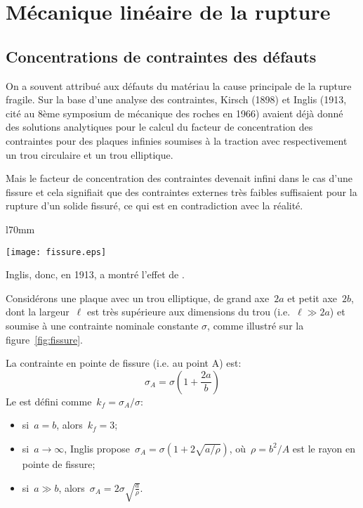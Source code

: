 \newpage
\section{Mécanique linéaire de la rupture}

\medskip
\subsection{Concentrations de contraintes des défauts}

\begin{histoire}%
\ifVersionDuDocEstVincent{}\selectfont\fi
On a souvent attribué aux défauts du matériau la cause principale de la rupture fragile. Sur la base d'une analyse des contraintes, Kirsch (1898) et Inglis (1913, cité au 8ème symposium de mécanique des roches en 1966) avaient déjà donné des solutions analytiques pour le calcul du facteur de concentration des contraintes pour des plaques infinies soumises à la traction avec respectivement un trou circulaire et un trou elliptique.

\medskip
Mais le facteur de concentration des contraintes devenait infini dans le cas d'une fissure et cela signifiait que des contraintes externes très faibles suffisaient pour la rupture d'un solide fissuré, ce qui est en contradiction avec la réalité.
\end{histoire}

\begin{wrapfigure}{l}{70mm}
\begin{center}
\texttt{[image: fissure.eps]}\label{fig:fissure}
\end{center}
\caption{Concentration de contraintes autour d'une fissure: cas plan}\label{fig:fissure}
\end{wrapfigure}
Inglis, donc, en 1913, a montré l'effet de .

\medskip
Considérons une plaque avec un trou elliptique, de grand axe~$2a$ et petit axe~$2b$, dont la largeur~$\ell$ est très supérieure aux dimensions du trou (i.e.~$\ell\gg 2a$) et soumise à une contrainte nominale constante $\sigma$, comme illustré sur la figure~\ref{fig:fissure}. 

La contrainte en pointe de fissure (i.e. au point A) est:
\begin{equation} \sigma_A = \sigma \left( 1+\frac{2a}b\right) \end{equation}
Le  est défini comme~$k_f = \sigma_A/\sigma$:
\begin{itemize}
  \item si~$a=b$, alors~$k_f=3$;
  \item si~$a\rightarrow\infty$, Inglis propose~$\sigma_A=\sigma (1+2\sqrt{a/\rho})$,
	où~$\rho=b^2/A$ est le rayon en pointe de fissure;
  \item si~$a\gg b$, alors~$\sigma_A=2\sigma \sqrt{\frac{a}{\rho}}$.
\end{itemize}


